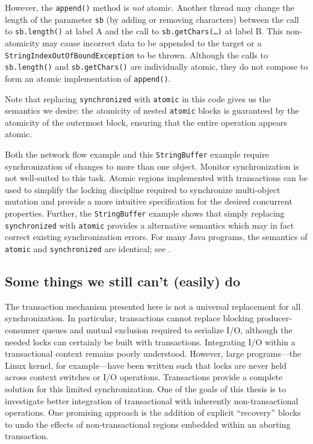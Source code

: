 However, the {\tt append()} method is \emph{not} atomic.  Another
thread may change the length of the parameter \texttt{sb} (by adding
or removing characters) between the call to \texttt{sb.length()} at
label A and the call to \texttt{sb.getChars(\ldots)} at label B.
This non-atomicity may cause incorrect data to be appended to the
target or a \texttt{StringIndexOutOfBoundException} to be thrown. 
Although the calls to
\texttt{sb.length()} and \texttt{sb.getChars()} are individually
atomic, they do not compose to form an atomic implementation of
\texttt{append()}.  

Note that replacing {\tt synchronized} with {\tt atomic} in
this code gives us the semantics
we desire: the atomicity of nested {\tt atomic} blocks is guaranteed
by the atomicity of the outermost block, ensuring that the entire
operation appears atomic.

Both the network flow example and this {\tt StringBuffer} example require
synchronization of
changes to more than one object.
Monitor synchronization is not
well-suited to this task.  Atomic regions implemented with
transactions can be used to simplify the locking discipline required
to synchronize multi-object mutation
and provide a more intuitive specification for the desired
concurrent properties.  Further, the {\tt StringBuffer} example shows
that simply replacing {\tt synchronized} with {\tt atomic} provides a
alternative semantics which may in fact correct existing
synchronization errors.
For many Java programs, the
semantics of {\tt atomic} and {\tt synchronized} are identical; see
.

\subsection{Some things we still can't (easily) do}\label{sec:xlimit}
The transaction mechanism presented here is not a universal
replacement for all synchronization.  In particular, transactions
cannot replace blocking producer-consumer queues and mutual exclusion
required to serialize I/O, although the needed locks can certainly be
built with transactions.  Integrating I/O within a transactional
context remains poorly understood.  However, large programs---the
Linux kernel, for example---have been
written such that locks are
never held across context switches or I/O operations.  Transactions
provide a complete solution for this limited synchronization.
One of the goals of this thesis is to investigate better integration
of transactional with inherently non-transactional operations.
One promising approach is the addition of explicit ``recovery'' blocks
to undo the effects of non-transactional regions embedded within
an aborting transaction.

